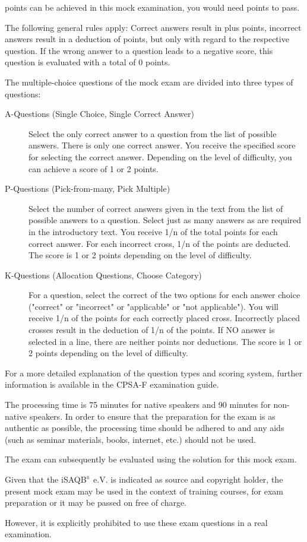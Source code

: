 \documentclass[12pt,a4paper]{article}
\newcounter{examQuestion}\setcounter{examQuestion}{1}
\newcommand{\registered}{$^\textrm{\tiny\textregistered}$}
\begin{document}
\examTotalPoints{} points can be achieved in this mock examination,
you would need \examMinPoints{} points to pass.

The following general rules apply: Correct answers result in plus
points, incorrect answers result in a deduction of points, but only
with regard to the respective question. If the wrong answer to a
question leads to a negative score, this question is evaluated with a
total of 0 points.

The multiple-choice questions of the mock exam are divided into three
types of questions:

\begin{description}
\item[A-Questions (Single Choice, Single Correct Answer)] Select the
  only correct answer to a question from the list of possible
  answers. There is only one correct answer. You receive the specified
  score for selecting the correct answer. Depending on the level of
  difficulty, you can achieve a score of 1 or 2 points.
\item[P-Questions (Pick-from-many, Pick Multiple)] Select the number
  of correct answers given in the text from the list of possible
  answers to a question. Select just as many answers as are required
  in the introductory text. You receive 1/n of the total points for
  each correct answer. For each incorrect cross, 1/n of the points are
  deducted. The score is 1 or 2 points depending on the level of
  difficulty.
\item[K-Questions (Allocation Questions, Choose Category)] For a
  question, select the correct of the two options for each answer
  choice ("correct" or "incorrect" or "applicable" or "not
  applicable"). You will receive 1/n of the points for each correctly
  placed cross. Incorrectly placed crosses result in the deduction of
  1/n of the points. If NO answer is selected in a line, there are
  neither points nor deductions. The score is 1 or 2 points depending
  on the level of difficulty.
\end{description}

For a more detailed explanation of the question types and scoring
system, further information is available in the CPSA-F examination
guide.

The processing time is 75 minutes for native speakers and 90 minutes
for non-native speakers. In order to ensure that the preparation for
the exam is as authentic as possible, the processing time should be
adhered to and any aids (such as seminar materials, books, internet,
etc.) should not be used.

The exam can subsequently be evaluated using the solution for this
mock exam.

Given that the iSAQB\registered{} e.V. is indicated as source and copyright
holder, the present mock exam may be used in the context of training
courses, for exam preparation or it may be passed on free of charge.

However, it is explicitly prohibited to use these exam questions in a
real examination.

\newpage

\setcounter{examQuestion}{1}

\end{document}
